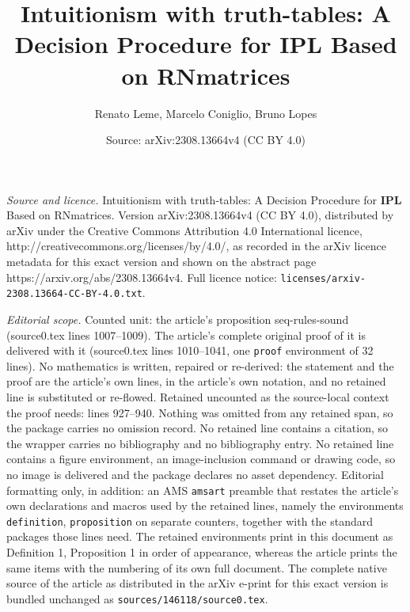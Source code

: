 \documentclass[10pt,a4paper]{amsart}
\title{Intuitionism with truth-tables: A Decision Procedure for \textbf{IPL} Based on RNmatrices}
\author{Renato Leme, Marcelo Coniglio, Bruno Lopes}
\date{Source: arXiv:2308.13664v4 (CC BY 4.0)}
\begin{document}
\maketitle

\noindent\emph{Source and licence.} Intuitionism with truth-tables: A Decision Procedure for \textbf{IPL} Based on RNmatrices. Version arXiv:2308.13664v4 (CC BY 4.0), distributed by arXiv under the Creative Commons Attribution 4.0 International licence, http://creativecommons.org/licenses/by/4.0/, as recorded in the arXiv licence metadata for this exact version and shown on the abstract page https://arxiv.org/abs/2308.13664v4. Full licence notice: \texttt{licenses/arxiv-2308.13664-CC-BY-4.0.txt}.\par\smallskip

\noindent\textit{Editorial scope.} Counted unit: the article's proposition seq-rules-sound (source0.tex lines 1007--1009). The article's complete original proof of it is delivered with it (source0.tex lines 1010--1041, one \texttt{proof} environment of 32 lines). No mathematics is written, repaired or re-derived: the statement and the proof are the article's own lines, in the article's own notation, and no retained line is substituted or re-flowed.  Retained uncounted as the source-local context the proof needs: lines 927--940.  Nothing was omitted from any retained span, so the package carries no omission record.  No retained line contains a citation, so the wrapper carries no bibliography and no bibliography entry.  No retained line contains a figure environment, an image-inclusion command or drawing code, so no image is delivered and the package declares no asset dependency.  Editorial formatting only, in addition: an AMS \texttt{amsart} preamble that restates the article's own declarations and macros used by the retained lines, namely the environments \texttt{definition}, \texttt{proposition} on separate counters, together with the standard packages those lines need.  The retained environments print in this document as Definition 1, Proposition 1 in order of appearance, whereas the article prints the same items with the numbering of its own full document.  The complete native source of the article as distributed in the arXiv e-print for this exact version is bundled unchanged as \texttt{sources/146118/source0.tex}.
\end{document}
